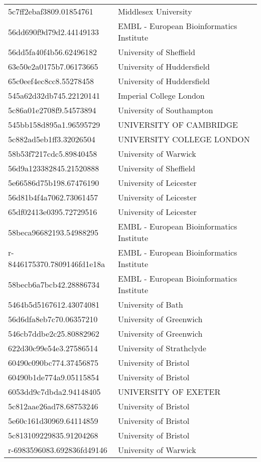 \begin{tabular}{ll}
5c7ff2ebaf3809.01854761 & Middlesex University \\
56dd690f9d79d2.44149133 & EMBL - European Bioinformatics Institute \\
56dd5fa40f4b56.62496182 & University of Sheffield \\
63e50e2a0175b7.06173665 & University of Huddersfield \\
65c0eef4ec8cc8.55278458 & University of Huddersfield \\
545a62d32db745.22120141 & Imperial College London \\
5c86a01e2708f9.54573894 & University of Southampton \\
545bb158d895a1.96595729 & UNIVERSITY OF CAMBRIDGE \\
5c882ad5eb1ff3.32026504 & UNIVERSITY COLLEGE LONDON \\
58b53f7217cdc5.89840458 & University of Warwick \\
56d9a123382845.21520888 & University of Sheffield \\
5e66586d75b198.67476190 & University of Leicester \\
56d81b4f4a7062.73061457 & University of Leicester \\
65df02413e0395.72729516 & University of Leicester \\
58beca96682193.54988295 & EMBL - European Bioinformatics Institute \\
r-8446175370.7809146fd1e18a & EMBL - European Bioinformatics Institute \\
58becb6a7bcb42.28886734 & EMBL - European Bioinformatics Institute \\
5464b5d5167612.43074081 & University of Bath \\
56d6dfa8eb7c70.06357210 & University of Greenwich \\
546cb7ddbe2c25.80882962 & University of Greenwich \\
622d30c99e54e3.27586514 & University of Strathclyde \\
60490c090bc774.37456875 & University of Bristol \\
60490b1de774a9.05115854 & University of Bristol \\
6053dd9c7dbda2.94148405 & UNIVERSITY OF EXETER \\
5c812aae26ad78.68753246 & University of Bristol \\
5e60c161d30969.64114859 & University of Bristol \\
5c813109229835.91204268 & University of Bristol \\
r-6983596083.692836fd49146 & University of Warwick \\

\end{tabular}
